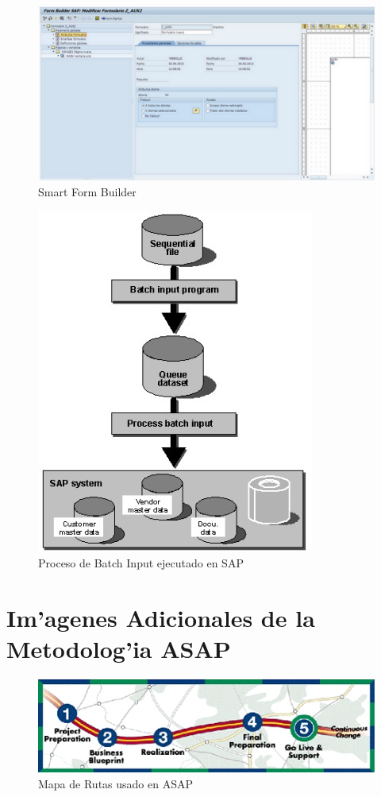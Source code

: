 \begin{figure}[H]
\centering
\includegraphics[scale=0.65,type=jpg,ext=.jpg,read=.jpg]{figures/builder}
\caption{Smart Form Builder}
\label{fig:builder}
\end{figure}

\begin{figure}[H]
\centering
\includegraphics[scale=1.0,type=jpg,ext=.jpg,read=.jpg]{figures/batch_input_process}
\caption{Proceso de Batch Input ejecutado en SAP}
\label{fig:process}
\end{figure}

\section{Im'agenes Adicionales de la Metodolog'ia ASAP}
\begin{figure}[htb]
\centering
\includegraphics[scale=0.65,type=jpg,ext=.jpg,read=.jpg]{figures/roadmap}
\caption{Mapa de Rutas usado en ASAP}
\label{fig:roadmap}
\end{figure}